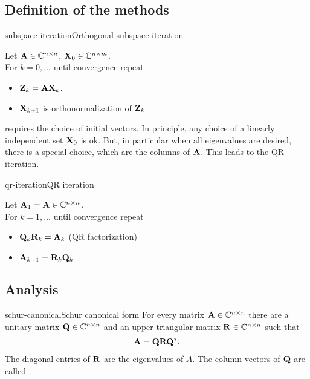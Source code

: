 \subsection{Definition of the methods}

\begin{Algorithm*}{subspace-iteration}{Orthogonal subspace iteration}

  Let $\mathbf A\in\mathbb C^{n\times n}$, $\mathbf X_0 \in \mathbb C^{n\times m}$.\\
  For $k=0,\ldots$ until convergence repeat
  \begin{itemize}
  \item $\mathbf Z_k = \mathbf A \mathbf X_k$.
  \item $\mathbf X_{k+1}$ is orthonormalization of $\mathbf Z_k$
  \end{itemize}
\end{Algorithm*}

\begin{remark}
   requires the choice of initial vectors. In principle, any choice of a linearly independent set $\mathbf X_0$ is ok. But, in particular when all eigenvalues are desired, there is a special choice, which are the columns of $\mathbf A$. This leads to the QR iteration.
\end{remark}

\begin{Algorithm*}{qr-iteration}{QR iteration}
  
  Let $\mathbf A_1 = \mathbf A\in\mathbb C^{n\times n}$.\\
  For $k=1,\ldots$ until convergence repeat
  \begin{itemize}
  \item $\mathbf Q_k\mathbf R_k = \mathbf A_k$ (QR factorization)
  \item $\mathbf A_{k+1} = \mathbf R_k\mathbf Q_k$
  \end{itemize}
\end{Algorithm*}

\subsection{Analysis}
\begin{Theorem*}{schur-canonical}{Schur canonical form}
  For every matrix $\mathbf A\in\mathbb C^{n\times n}$ there are a unitary matrix
  $\mathbf Q\in\mathbb C^{n\times n}$ and an upper triangular matrix $\mathbf R\in\mathbb C^{n\times n}$ such
  that
  \begin{gather}
    \mathbf A = \mathbf Q \mathbf R \mathbf Q^*.
  \end{gather}
  The diagonal entries of $\mathbf R$ are the eigenvalues of $A$. The
  column vectors of $\mathbf Q$ are called .
\end{Theorem*}

